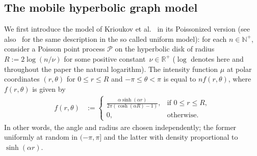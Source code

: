 \subsection{The mobile hyperbolic graph model}\label{sec:model}
%
We first introduce the model of Krioukov et al.~\cite{KPKVB10} in its Poissonized version (see also~\cite{GPP12} for the same description in the so called uniform model): for each $n \in \mathbb{N}^+$, consider a Poisson point process $\mathcal{P}$ on the hyperbolic disk of radius $R :=2 \log (n/\nu)$ for some positive constant~$\nu \in \mathbb{R}^+$ ($\log$ denotes here and throughout the paper the natural logarithm).
The intensity function $\mu$ at polar coordinates $(r,\theta)$ for 
  $0\leq r\leq R$ and $-\pi \leq \theta < \pi$ is equal to $n f(r,\theta)$, where $f(r,\theta)$ is given by
\begin{align*}
f(r,\theta) & := \begin{cases}
  \displaystyle
 \frac{\alpha \sinh(\alpha r)}{2\pi(\cosh(\alpha R)-1)}, 
  &\text{if $0\leq r\leq R$}, \\[2ex]
  0, & \text{otherwise.}
  \end{cases}
\end{align*}
In other words, the angle and radius are chosen independently; the former uniformly at random in $(-\pi,\pi]$ and the latter with density proportional to $\sinh(\alpha r)$. 

